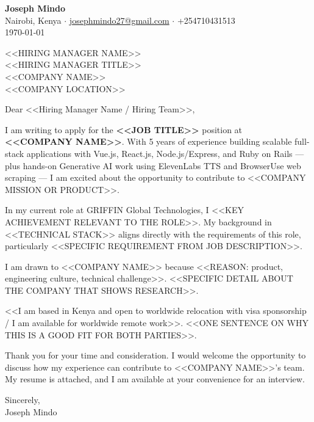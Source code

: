 \documentclass[11pt,a4paper]{article}
\begin{document}
\begin{flushright}
    {\large\bfseries Joseph Mindo}\\[2pt]
    {\small Nairobi, Kenya $\cdot$ \href{mailto:josephmindo27@gmail.com}{josephmindo27@gmail.com} $\cdot$ +254710431513}\\[2pt]
    {\today}
\end{flushright}

\vspace{0.5cm}

\begin{flushleft}
    <<HIRING MANAGER NAME>>\\
    <<HIRING MANAGER TITLE>>\\
    <<COMPANY NAME>>\\
    <<COMPANY LOCATION>>
\end{flushleft}

\vspace{0.5cm}

Dear <<Hiring Manager Name / Hiring Team>>,

I am writing to apply for the \textbf{<<JOB TITLE>>} position at \textbf{<<COMPANY NAME>>}. With 5 years of experience building scalable full-stack applications with Vue.js, React.js, Node.js/Express, and Ruby on Rails --- plus hands-on Generative AI work using ElevenLabs TTS and BrowserUse web scraping --- I am excited about the opportunity to contribute to <<COMPANY MISSION OR PRODUCT>>.

In my current role at GRIFFIN Global Technologies, I <<KEY ACHIEVEMENT RELEVANT TO THE ROLE>>. My background in <<TECHNICAL STACK>> aligns directly with the requirements of this role, particularly <<SPECIFIC REQUIREMENT FROM JOB DESCRIPTION>>.

I am drawn to <<COMPANY NAME>> because <<REASON: product, engineering culture, technical challenge>>. <<SPECIFIC DETAIL ABOUT THE COMPANY THAT SHOWS RESEARCH>>.

<<I am based in Kenya and open to worldwide relocation with visa sponsorship / I am available for worldwide remote work>>. <<ONE SENTENCE ON WHY THIS IS A GOOD FIT FOR BOTH PARTIES>>.

Thank you for your time and consideration. I would welcome the opportunity to discuss how my experience can contribute to <<COMPANY NAME>>'s team. My resume is attached, and I am available at your convenience for an interview.

Sincerely,\\[12pt]
Joseph Mindo
\end{document}
